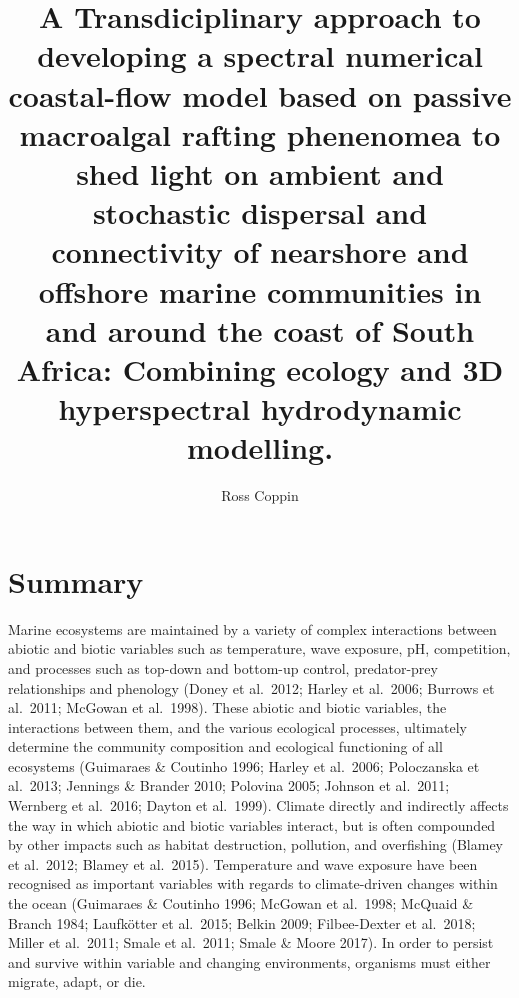 \documentclass[]{article}
\title{A Transdiciplinary approach to developing a spectral numerical
coastal-flow model based on passive macroalgal rafting phenenomea to
shed light on ambient and stochastic dispersal and connectivity of
nearshore and offshore marine communities in and around the coast of
South Africa: Combining ecology and 3D hyperspectral hydrodynamic
modelling.}
\author{Ross Coppin}
\date{}
\begin{document}
\maketitle

\hypertarget{summary}{%
\section{Summary}\label{summary}}

Marine ecosystems are maintained by a variety of complex interactions
between abiotic and biotic variables such as temperature, wave exposure,
pH, competition, and processes such as top-down and bottom-up control,
predator-prey relationships and phenology (Doney et al.~2012; Harley et
al.~2006; Burrows et al.~2011; McGowan et al.~1998). These abiotic and
biotic variables, the interactions between them, and the various
ecological processes, ultimately determine the community composition and
ecological functioning of all ecosystems (Guimaraes \& Coutinho 1996;
Harley et al.~2006; Poloczanska et al.~2013; Jennings \& Brander 2010;
Polovina 2005; Johnson et al.~2011; Wernberg et al.~2016; Dayton et
al.~1999). Climate directly and indirectly affects the way in which
abiotic and biotic variables interact, but is often compounded by other
impacts such as habitat destruction, pollution, and overfishing (Blamey
et al.~2012; Blamey et al.~2015). Temperature and wave exposure have
been recognised as important variables with regards to climate-driven
changes within the ocean (Guimaraes \& Coutinho 1996; McGowan et
al.~1998; McQuaid \& Branch 1984; Laufkötter et al.~2015; Belkin 2009;
Filbee-Dexter et al.~2018; Miller et al.~2011; Smale et al.~2011; Smale
\& Moore 2017). In order to persist and survive within variable and
changing environments, organisms must either migrate, adapt, or die.
\end{document}
